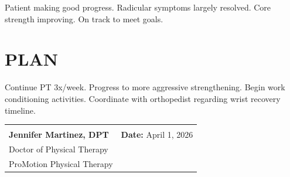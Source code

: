 \documentclass[11pt]{article}
\begin{document}
Patient making good progress. Radicular symptoms largely resolved. Core strength improving. On track to meet goals.

\section*{PLAN}

Continue PT 3x/week. Progress to more aggressive strengthening. Begin work conditioning activities. Coordinate with orthopedist regarding wrist recovery timeline.

\vspace{2em}

\begin{tabular}{@{}p{7cm}p{7cm}@{}}
\hrulefill & \\
\textbf{Jennifer Martinez, DPT} & \textbf{Date:} April 1, 2026 \\
Doctor of Physical Therapy & \\
ProMotion Physical Therapy & \\
\end{tabular}
\end{document}
